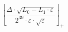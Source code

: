 \[\left\lfloor \frac{\Delta \cdot \sqrt{L_0 + L_1 \cdot \varepsilon}}{2^{39} \cdot \varepsilon \cdot \sqrt{\varepsilon}} \right\rfloor_{+}\]
